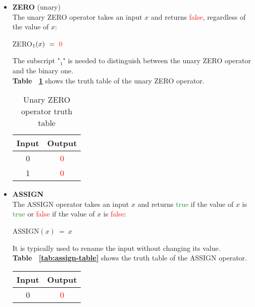 \documentclass[]{usiinfbachelorproject}
\begin{document}
\begin{itemize}
    \item \textbf{ZERO} (unary)
        \vspace{0.2cm} \\
        The unary ZERO operator takes an input $x$ and returns \textcolor{red}{false}, regardless of the value of $x$:
        \begin{center}
            ZERO$_1(x) \ = \ \textcolor{red}{0}$
        \end{center}
        The subscript "$_1$" is needed to distinguish between the unary ZERO operator and the binary one. \\
        \textbf{Table ~\ref{tab:zero-unary-table}} shows the truth table of the unary ZERO operator.
        \begin{table}[H]
            \centering
            \begin{tabular}{|c|c|}
                \hline
                \textbf{Input} & \textbf{Output} \\
                \hline
                0 & \textcolor{red}{0} \\
                \hline
                1 & \textcolor{red}{0} \\
                \hline
            \end{tabular}
            \caption{Unary ZERO operator truth table}
            \label{tab:zero-unary-table}
        \end{table}
    \item \textbf{ASSIGN}
        \vspace{0.2cm} \\
        The ASSIGN operator takes an input $x$ and returns \textcolor{ForestGreen}{true} if the value of $x$ is \textcolor{ForestGreen}{true} or \textcolor{red}{false} if the value of $x$ is \textcolor{red}{false}:
        \begin{center}
            ASSIGN$(x) \ = \ x$
        \end{center}
        It is typically used to rename the input without changing its value. \\
        \textbf{Table ~\ref{tab:assign-table}} shows the truth table of the ASSIGN operator.
        \begin{table}[H]
            \centering
            \begin{tabular}{|c|c|}
                \hline
                \textbf{Input} & \textbf{Output} \\
                \hline
                0 & \textcolor{red}{0} \\

\end{tabular}
\end{table}
\end{itemize}
\end{document}
